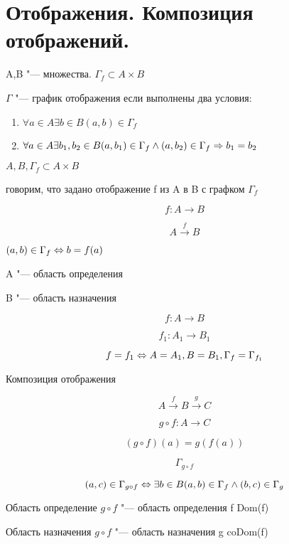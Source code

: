 ﻿\section{Отображения. Композиция отображений.}

\begin{Def}
A,B "--- множества.
$\Gamma_{f} \subset A \times B$

$\Gamma$ "--- график отображения если выполнены два условия:

\begin{enumerate}
\item $\forall a \in A \exists b \in B (a, b) \in \Gamma_{f}$
\item $\forall a \in A \exists b_1, b_2 \in B (a, b_1) \in \Gamma_f \wedge (a, b_2) \in \Gamma_f \Rightarrow b_1 = b_2$
\end{enumerate} 
\end{Def}

\begin{Def}
$A, B, \Gamma_f \subset A \times B$

говорим, что задано отображение f из A в B с графком $\Gamma_f$

$$f:A \to B$$

$$A \xrightarrow{f} B$$

$(a, b) \in \Gamma_f \Leftrightarrow b = f(a)$

A "--- область определения

B "--- область назначения
\end{Def}

$$f: A \to B$$

$$f_1: A_1 \to B_1$$

$$f = f_1 \Leftrightarrow A = A_1, B = B_1, \Gamma_f = \Gamma_{f_1} $$

\begin{Def}{Композиция отображения}

$$A \xrightarrow{f} B \xrightarrow{g} C$$

$$g \circ f: A \to C$$

$$(g \circ f)(a) = g(f(a))$$

$$\Gamma_{g \circ f}$$

$$(a, c) \in \Gamma_{g \circ f} \Leftrightarrow \exists b \in B (a, b) \in \Gamma_{f} \wedge (b, c) \in \Gamma_g$$

Область определение $g \circ f$ "--- область определения f Dom(f) 

Область назначения $g \circ f$ "--- область назначения g coDom(f)

\end{Def}

